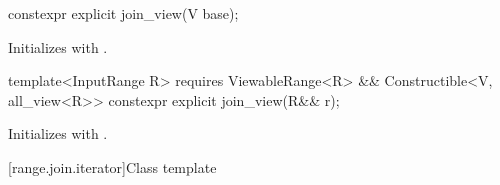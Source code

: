 %
\begin{itemdecl}
constexpr explicit join_view(V base);
\end{itemdecl}

\begin{itemdescr}
\pnum
\effects Initializes  with .
\end{itemdescr}

%
\begin{itemdecl}
template<InputRange R>
  requires ViewableRange<R> && Constructible<V, all_view<R>>
constexpr explicit join_view(R&& r);
\end{itemdecl}

\begin{itemdescr}
\pnum
\effects Initializes  with .
\end{itemdescr}

[range.join.iterator]{Class template }

